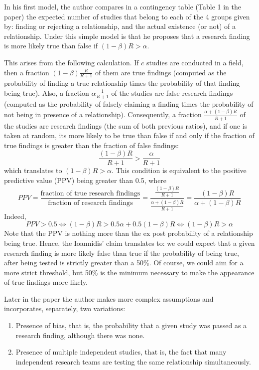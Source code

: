 \documentclass[11pt, english]{article}
\begin{document}
In his first model, the author compares in a contingency table (Table 1
in the paper) the expected number of studies that belong to each of the
4 groups given by: finding or rejecting a relationship, and the actual
existence (or not) of a relationship. Under this simple model is that he
proposes that a research finding is more likely true than false if
\((1-\beta)R > \alpha\).

This arises from the following calculation. If \(c\) studies are
conducted in a field, then a fraction \((1-\beta)\frac{R}{R+1}\) of them
are true findings (computed as the probability of finding a true
relationship times the probability of that finding being true). Also, a
fraction \(\alpha\frac{1}{R+1}\) of the studies are false research
findings (computed as the probability of falsely claiming a finding
times the probability of not being in presence of a relationship).
Consequently, a fraction \(\frac{\alpha + (1-\beta)R}{R+1}\) of the
studies are research findings (the sum of both previous ratios), and if
one is taken at random, its more likely to be true than false if and
only if the fraction of true findings is greater than the fraction of
false findings: \[\frac{(1-\beta)R}{R+1} > \frac{\alpha}{R+1}\] which
translates to \((1-\beta)R > \alpha\). This condition is equivalent to
the positive predictive value (PPV) being greater than 0.5, where
\[ PPV = \frac{\text{fraction of true research findings}}{\text{fraction of research findings}} = \frac{\frac{(1-\beta)R}{R+1}}{\frac{\alpha + (1-\beta)R}{R+1}} = \frac{(1-\beta)R}{\alpha + (1-\beta)R} \]
Indeed,
\[PPV > 0.5 \Longleftrightarrow (1-\beta)R > 0.5\alpha + 0.5(1-\beta)R \Longleftrightarrow (1-\beta)R > \alpha \]
Note that the PPV is nothing more than the ex post probability of a
relationship being true. Hence, the Ioannidis' claim translates to: we
could expect that a given research finding is more likely false than
true if the probability of being true, after being tested is
strictly greater than a 50\%. Of course, we could aim for a more strict
threshold, but 50\% is the minimum necessary to make the appearance of
true findings more likely.

Later in the paper the author makes more complex assumptions and
incorporates, separately, two variations:
\begin{enumerate}
\item Presence of bias, that is, the probability that a given study was passed
as a research finding, although there was none.

\item Presence of multiple independent studies, that is, the fact that many
independent research teams are testing the same relationship
simultaneously.
\end{enumerate}
\end{document}
